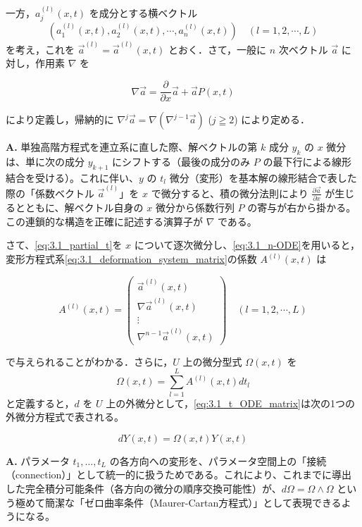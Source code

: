 一方，$a_j^{(l)}(x,t)$ を成分とする横ベクトル
\[
  \left( a_1^{(l)}(x,t), a_2^{(l)}(x,t), \cdots, a_n^{(l)}(x,t) \right) \quad (l=1, 2, \cdots, L)
\]
を考え，これを $\vec{a}^{(l)} = \vec{a}^{(l)}(x,t)$ とおく．さて，一般に $n$ 次ベクトル $\vec{a}$ に対し，作用素 $\nabla$ を

\begin{equation}\label{eq:3.1_nabla}
  \nabla \vec{a} = \frac{\partial}{\partial x}\vec{a} + \vec{a}P(x,t)
\end{equation}

により定義し，帰納的に $\nabla^j \vec{a} = \nabla(\nabla^{j-1}\vec{a})$ ($j \geqq 2$) により定める．

\begin{Q}
\textbf{A.} 単独高階方程式を連立系に直した際、解ベクトルの第 $k$ 成分 $y_k$ の $x$ 微分は、単に次の成分 $y_{k+1}$ にシフトする（最後の成分のみ $P$ の最下行による線形結合を受ける）。これに伴い、$y$ の $t_l$ 微分（変形）を基本解の線形結合で表した際の「係数ベクトル $\vec{a}^{(l)}$」を $x$ で微分すると、積の微分法則により $\frac{\partial \vec{a}}{\partial x}$ が生じるとともに、解ベクトル自身の $x$ 微分から係数行列 $P$ の寄与が右から掛かる。この連鎖的な構造を正確に記述する演算子が $\nabla$ である。
\end{Q}

さて、\eqref{eq:3.1_partial_t}を $x$ について逐次微分し、\eqref{eq:3.1_n-ODE}を用いると，変形方程式系\eqref{eq:3.1_deformation_system_matrix}の係数 $A^{(l)}(x,t)$ は

\begin{equation}\label{eq:3.1_matrix_A}
  A^{(l)}(x,t) =
  \begin{pmatrix}
    \vec{a}^{(l)}(x,t) \\[2mm]
    \nabla \vec{a}^{(l)}(x,t) \\
    \vdots \\
    \nabla^{n-1} \vec{a}^{(l)}(x,t)
  \end{pmatrix}
  \quad (l=1,2,\cdots,L)
\end{equation}

で与えられることがわかる．さらに，$U$ 上の微分型式 $\Omega(x,t)$ を
\[
  \Omega(x,t) = \sum_{l=1}^L A^{(l)}(x,t)dt_l
\]
と定義すると，$d$ を $U$ 上の外微分として，\eqref{eq:3.1_t_ODE_matrix}は次の1つの外微分方程式で表される。

\[
  dY(x,t) = \Omega(x,t)Y(x,t)
\]

\begin{Q}[複数の変形方程式を微分形式 $\Omega(x,t)$ を用いて $dY = \Omega Y$ と1つにまとめる幾何学的なメリットは何か？]
\textbf{A.} パラメータ $t_1, \dots, t_L$ の各方向への変形を、パラメータ空間上の「接続（connection）」として統一的に扱うためである。これにより、これまでに導出した完全積分可能条件（各方向の微分の順序交換可能性）が、$d\Omega = \Omega \wedge \Omega$ という極めて簡潔な「ゼロ曲率条件（Maurer-Cartan方程式）」として表現できるようになる。
\end{Q}

